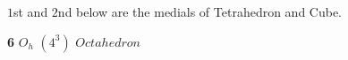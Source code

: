 \documentclass{beamer}
\begin{document}
\begin{frame}
$1$st and $2$nd below are the medials of Tetrahedron and Cube.
\begin{center}
\begin{minipage}{2.2cm}
\centering
{}\par
{\bf 6}  $O_h$
$(4^3)$ {\bf $Octahedron$}
\end{minipage}
\begin{minipage}{2.2cm}
\centering

\end{minipage}
\end{center}
\end{frame}
\end{document}
